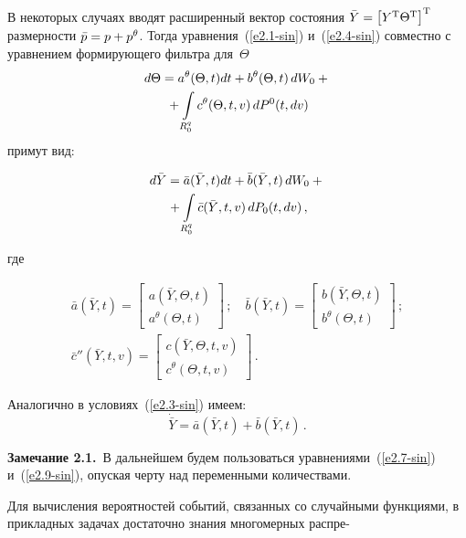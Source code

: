 \begin{multicols}{2}
В некоторых случаях  вводят расширенный вектор состояния $\bar Y \hm=\lk Y^{\mathrm{T}} \Theta^{\mathrm{T}}\rk^{\mathrm{T}}$ 
размерности $\bar p \hm= p\hm+p^\theta$. 
Тогда уравнения~(\ref{e2.1-sin}) и~(\ref{e2.4-sin}) совместно с уравнением формирующего фильтра для~$\Theta$
    \begin{multline*}
    d\Theta= {a}^\theta (\Theta,t) dt + {b}^\theta (\Theta, t)\, dW_0 +{}\\
    {}+ \iii_{R_0^q} {c}^\theta (\Theta,t,v)\, dP^0 (t, dv) %
    \end{multline*}
примут вид:

\noindent
    \begin{multline}
    d \bar Y = \bar a(\bar Y,t) dt + \bar b (\bar Y,t)\, dW_0 +{}\\
    {}+ \int\limits_{R_0^q} \bar c (\bar Y, t, v)\, dP_0 (t, dv)\,,\label{e2.7-sin}
    \end{multline}
    
    \noindent
где

\noindent
   \begin{gather*}
    \bar a (\bar Y,t) = \begin{bmatrix}  
    a (\bar Y,\Theta,t)\\
    {a}^\theta (\Theta,t)\end{bmatrix}\,;\quad
    \bar b (\bar Y,t) =\begin{bmatrix}
    b (\bar Y,\Theta,t)\\
    {b}^\theta (\Theta,t)\end{bmatrix}\,;
\\
 \bar c'' (\bar Y,t,v) =\begin{bmatrix}
    c (\bar Y,\Theta,t,v)\\
    {c}^\theta (\Theta,t,v)\end{bmatrix}\,. %
    \end{gather*}

Аналогично в условиях~(\ref{e2.3-sin}) имеем:
\begin{equation}
\dot{\bar Y} =\bar a (\bar Y, t) +\bar b  (\bar Y, t)\,.\label{e2.9-sin}
\end{equation}

\smallskip

\noindent
{\small \textbf{Замечание 2.1.}\ В дальнейшем будем пользоваться уравнениями~(\ref{e2.7-sin}) и~(\ref{e2.9-sin}), 
опуская черту над переменными количествами.}

\smallskip

Для вычисления вероятностей событий,
связанных со случайными функциями, в прикладных задачах достаточно
знания многомерных распре-\linebreak\vspace*{-12pt}


\end{multicols}
